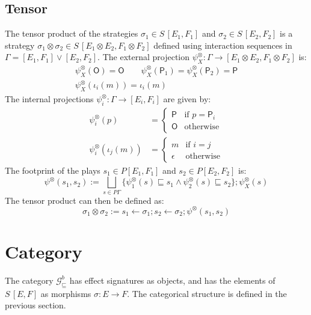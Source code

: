 \documentclass[draft,11pt]{report}
\newcommand{\gcat}{\mathcal{G}_{\sqsubseteq}}
\newcommand{\kw}[1]{\ensuremath{ \mathsf{#1} }}
\begin{document}

\subsection{Tensor} %

The tensor product of the strategies
$\sigma_1 \in S\,[E_1,F_1]$ and 
$\sigma_2 \in S\,[E_2,F_2]$
is a strategy
$\sigma_1 \otimes \sigma_2 \in S\,[E_1 \otimes E_2, F_1 \otimes F_2]$
defined using interaction sequences in
$\Gamma = [E_1,F_1] \vee [E_2,F_2]$.
The external projection
$\psi^\otimes_X : \Gamma \rightarrow [E_1 \otimes E_2, F_1 \otimes F_2]$
is:
\begin{gather*}
  \psi^\otimes_X(\kw{O}) = \kw{O} \qquad
  \psi^\otimes_X(\kw{P}_1) = \psi^\otimes_X(\kw{P}_2) = \kw{P} \\
  \psi^\otimes_X(\iota_i(m)) = \iota_i(m)
\end{gather*}
The internal projections
$\psi^\otimes_i : \Gamma \rightarrow [E_i, F_i]$
are given by:
\begin{align*}
  \psi^\otimes_i(p) &= \begin{cases}
    \kw{P} & \text{if } p = \kw{P}_i \\
    \kw{O} & \text{otherwise}
  \end{cases} \\
  \psi^\otimes_i(\iota_j(m)) &= \begin{cases}
    m & \text{if } i = j \\
    \epsilon & \text{otherwise}
  \end{cases}
\end{align*}
The footprint of the plays
$s_1 \in P [E_1,F_1]$ and $s_2 \in P [E_2, F_2]$
is:
\[
  \psi^\otimes(s_1, s_2) :=
  \bigsqcup_{s \in P \Gamma}
  \{ \psi^\otimes_1(s) \sqsubseteq s_1 \wedge
     \psi^\otimes_2(s) \sqsubseteq s_2 \} ;
  \psi^\otimes_X(s)
\]
The tensor product can then be defined as:
\[
  \sigma_1 \otimes \sigma_2 :=
  s_1 \leftarrow \sigma_1 ;
  s_2 \leftarrow \sigma_2 ;
  \psi^\otimes(s_1, s_2)
\]



\section{Category} \label{sec:gamesem:cat} %

The category $\gcat^b$
has effect signatures as objects,
and has the elements of $S \, [E,F]$
as morphisms $\sigma : E \rightarrow F$.
The categorical structure is
defined in the previous section.
\end{document}
